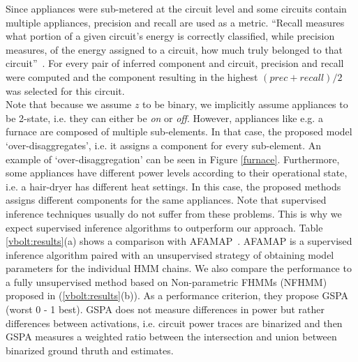 Since appliances were sub-metered at the circuit level and some circuits contain multiple appliances, precision and recall are used as a metric. ``Recall measures what portion of a given circuit’s energy is correctly classified, while precision measures, of the energy assigned to a circuit, how much truly belonged to that circuit''~\cite{kolter2012fhmm}. For every pair of inferred component and circuit, precision and recall were computed and the component resulting in the highest $(prec + recall)/2$ was selected for this circuit.\\
Note that because we assume $z$ to be binary, we implicitly assume appliances to be 2-state, i.e. they can either be \emph{on} or \emph{off}. However, appliances like e.g. a furnace are composed of multiple sub-elements. In that case, the proposed model `over-disaggregates', i.e. it assigns a component for every sub-element. An example of `over-disaggregation' can be seen in Figure \ref{furnace}. Furthermore, some appliances have different power levels according to their operational state, i.e. a hair-dryer has different heat settings. In this case, the proposed methods assigns different components for the same appliances. Note that supervised inference techniques usually do not suffer from these problems. This is why we expect supervised inference algorithms to outperform our approach. Table \ref{vbolt:results}(a) shows a comparison with AFAMAP~\cite{kolter2012fhmm}. AFAMAP is a supervised inference algorithm paired with an unsupervised strategy of obtaining model parameters for the individual HMM chains.
We also compare the performance to a fully unsupervised method based on Non-parametric FHMMs (NFHMM) proposed in \cite{jia2015fully} (\ref{vbolt:results}(b)). As a performance criterion, they propose GSPA (worst 0 - 1 best). GSPA does not measure differences in power but rather differences between activations, i.e. circuit power traces are binarized and then GSPA measures a weighted ratio between the intersection and union between binarized ground thruth and estimates.


